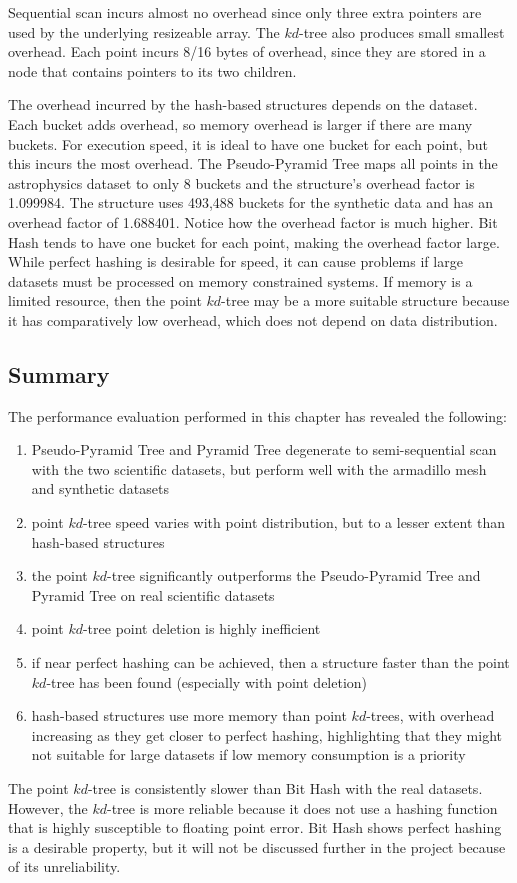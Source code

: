 Sequential scan incurs almost no overhead since only three extra pointers are used by the underlying resizeable array. The $kd$-tree also produces small smallest overhead. Each point incurs 8/16 bytes of overhead, since they are stored in a node that contains pointers to its two children. 

The overhead incurred by the hash-based structures depends on the dataset. Each bucket adds overhead, so memory overhead is larger if there are many buckets. For execution speed, it is ideal to have one bucket for each point, but this incurs the most overhead. The Pseudo-Pyramid Tree maps all points in the astrophysics dataset to only 8 buckets and the structure's overhead factor is 1.099984. The structure uses 493,488 buckets for the synthetic data and has an overhead factor of 1.688401. Notice how the overhead factor is much higher. Bit Hash tends to have one bucket for each point, making the overhead factor large. While perfect hashing is desirable for speed, it can cause problems if large datasets must be processed on memory constrained systems. If memory is a limited resource, then the point $kd$-tree may be a more suitable structure because it has comparatively low overhead, which does not depend on data distribution.

\subsection{Summary}

The performance evaluation performed in this chapter has revealed the following:
\begin{enumerate}
	\item Pseudo-Pyramid Tree and Pyramid Tree degenerate to semi-sequential scan with the two scientific datasets, but perform well with the armadillo mesh and synthetic datasets
	\item point $kd$-tree speed varies with point distribution, but to a lesser extent than hash-based structures
	\item the point $kd$-tree significantly outperforms the Pseudo-Pyramid Tree and Pyramid Tree on real scientific datasets
	\item point $kd$-tree point deletion is highly inefficient
	\item if near perfect hashing can be achieved, then a structure faster than the point $kd$-tree has been found (especially with point deletion)
	\item hash-based structures use more memory than point $kd$-trees, with overhead increasing as they get closer to perfect hashing, highlighting that they might not suitable for large datasets if low memory consumption is a priority
\end{enumerate}

The point $kd$-tree is consistently slower than Bit Hash with the real datasets. However, the $kd$-tree is more reliable because it does not use a hashing function that is highly susceptible to floating point error. Bit Hash shows perfect hashing is a desirable property, but it will not be discussed further in the project because of its unreliability.